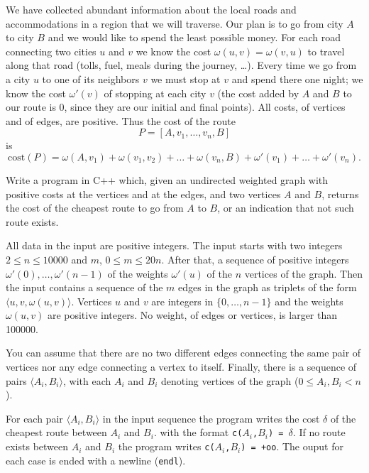 \Statement
We have collected abundant
information about the local roads and accommodations in a region that
we will traverse. Our plan is to go from city $A$ to city $B$ and
we would like to spend the least possible money. For each road
connecting two cities $u$ and $v$ we know the cost $\omega(u,v)=\omega(v,u)$
to travel
along that road (tolls, fuel, meals during the journey, \ldots). Every
time we go from a city $u$ to one of its neighbors $v$ we must stop at
$v$ and spend there one night; we know the cost $\omega'(v)$
of stopping at each city $v$ (the cost added by $A$ and $B$ to
our route is 0, since they
are our initial and final points).
All costs, of vertices and of edges, are positive. Thus the cost
of the route 
\[
P = [A, v_1, \ldots, v_n, B]
\]
is
\[
  \text{cost}(P) = \omega(A,v_1) + \omega(v_1,v_2) + \ldots + \omega(v_n,B) 
  + \omega'(v_1)+\ldots+\omega'(v_n).
\]

Write a program in C++ which, given an undirected weighted graph with
positive
costs at the vertices and at the edges, and two vertices $A$ and $B$,
returns the cost of the cheapest route to go from $A$ to $B$, or an
indication that not such route exists.

\Input
All data in the input are positive integers.
The input starts with two integers $2{\le}n{\le}10000$ and $m$, $0{\le}m\le{20n}$.
After that, a sequence of positive
integers $\omega'(0), \ldots, \omega'(n-1)$ of
the weights $\omega'(u)$ of the
$n$ vertices of the graph.  Then the input contains
a sequence of the $m$ edges in the graph
as triplets of the form ${\langle}u,v,\omega(u,v)\rangle$. Vertices
$u$ and $v$ are integers 
in $\{0,\ldots,n-1\}$ and the weights $\omega(u,v)$ are positive integers.
No weight, of edges or vertices, is larger than 100000.

You can assume that there are no two different edges connecting
the same pair of vertices nor any edge connecting a vertex to itself.
Finally, there is
a sequence of pairs ${\langle}A_i, B_i\rangle$, with each $A_i$ and $B_i$
denoting vertices of the graph ($0{\le}A_i,B_i<n$).

\Output
For each pair ${\langle}A_i, B_i\rangle$ in the input sequence the program
writes the cost $\delta$ of the cheapest route between $A_i$ and $B_i$. with the format
\texttt{c($A_i$,$B_i$) = $\delta$}.
If no route exists between $A_i$ and $B_i$ the program
writes \texttt{c($A_i$,$B_i$) = +oo}. The ouput for each case is
ended with a newline (\texttt{endl}).

\SampleTwoCol
